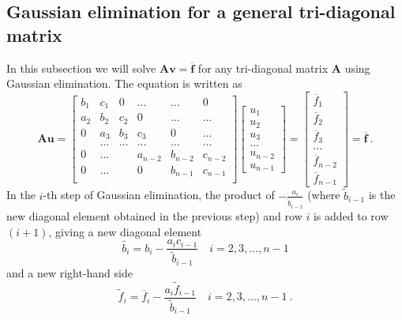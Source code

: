 \documentclass{article}
\begin{document}
	\subsection{Gaussian elimination for a general tri-diagonal matrix}\label{m1}
	In this subsection we will solve $\mathbf{A}\mathbf{v} = \overline{\mathbf{f}}$
	for any tri-diagonal matrix $\mathbf{A}$ using Gaussian elimination. 
	The equation is written as 
	\begin{equation}\label{gentri}
	\mathbf{A}\mathbf{u} = \begin{bmatrix}
	b_1& c_1& 0 &\dots   & \dots &0 \\
	a_2 & b_2 & c_2 &0 &\dots &\dots \\
	0&a_3 &b_3 & c_3 & 0 & \dots \\
	& \dots   & \dots &\dots   &\dots & \dots \\
	0&\dots   &  &a_{n-2} &b_{n-2}& c_{n-2} \\
	0&\dots    &  & 0  &b_{n-1} & c_{n-1} \\
	\end{bmatrix}
	\begin{bmatrix}
	u_1 \\
	u_2 \\
	u_3 \\
	\dots \\
	u_{n-2} \\
	u_{n-1}
	\end{bmatrix}
	=
	\begin{bmatrix}
	\overline{f}_1 \\
	\overline{f}_2 \\
	\overline{f}_3 \\
	\dots \\
	\overline{f}_{n-2} \\
	\overline{f}_{n-1}
	\end{bmatrix}
	=\overline{\mathbf{f}}\ .
	\end{equation}
	In the $i$-th step of Gaussian elimination, the product of $-\frac{a_i}{\tilde{b}_{i-1}}$ 
	(where $\tilde{b}_{i-1}$ is the new diagonal element obtained in the previous step) and row $i$
	is added to row $(i+1)$, giving a new diagonal element
	\begin{equation}\label{tildeb}
	\tilde{b_{i}}=b_i-\frac{a_i c_{i-1}}{\tilde{b}_{i-1}}\quad i=2,3,\dots,n-1
	\end{equation}
	and a new right-hand side 
	\begin{equation}\label{tildef}
	\tilde{f}_i=\overline{f}_i-\frac{a_i \tilde{f}_{i-1}}{\tilde{b}_{i-1}}\quad i=2,3,\dots,n-1\ . 
	\end{equation}
\end{document}
